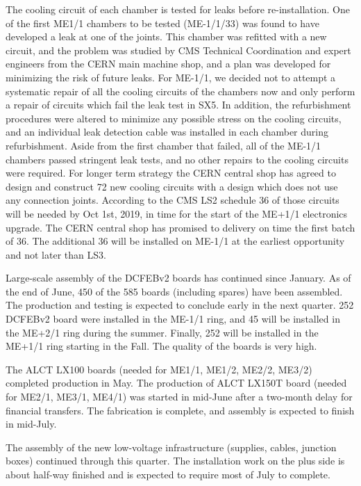 \documentclass[12pt]{article}
\begin{document}
The cooling circuit of each chamber is tested for leaks before re-installation.  One of the first ME1/1 chambers to be tested (ME-1/1/33) was found to have developed a leak at one of the joints. This chamber was refitted with a new circuit, and the problem was studied by CMS Technical Coordination and expert engineers from the CERN main machine shop, and a plan was developed for minimizing the risk of future leaks.
For ME-1/1, we decided not to attempt a systematic repair of all the cooling circuits of the chambers now and only perform a repair of circuits which fail the leak test in SX5. In addition, the refurbishment procedures were altered to minimize any possible stress on the cooling circuits, and an individual leak detection cable was installed in each chamber during refurbishment. Aside from the first chamber that failed, all of the ME-1/1 chambers passed stringent leak tests, and no other repairs to the cooling circuits were required. For longer term strategy the CERN central shop has agreed to design and construct 72 new cooling circuits with a design which does not use any connection joints. According to the CMS LS2 schedule 36 of those circuits will be needed by Oct 1st, 2019, in time for the start of the ME+1/1 electronics upgrade. The CERN central shop has promised to delivery on time the first batch of 36. The additional 36 will be installed on ME-1/1 at the earliest opportunity and not later than LS3.

Large-scale assembly of the DCFEBv2 boards has continued since January.  As of the end of June, 450 of the 585 boards (including spares) have been assembled.  The production and testing is expected to conclude early in the next quarter.  252 DCFEBv2 board were installed in the ME-1/1 ring, and 45 will be installed in the ME+2/1 ring during the summer.  Finally, 252 will be installed in the ME+1/1 ring starting in the Fall.  The quality of the boards is very high.  

The ALCT LX100 boards (needed for ME1/1, ME1/2, ME2/2, ME3/2)  completed production in May.  The production of ALCT LX150T board (needed for ME2/1, ME3/1, ME4/1) was started in mid-June after a two-month delay for financial transfers.   The fabrication is complete, and assembly is expected to finish in mid-July.


The assembly of the new low-voltage infrastructure (supplies, cables, junction boxes) continued through this quarter.  The installation work on the plus side is about half-way finished and is expected to require most of July to complete.  
\end{document}
